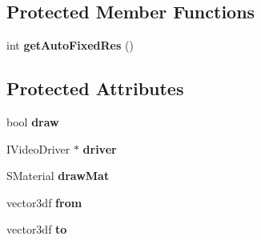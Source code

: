 \subsection*{Protected Member Functions}
\begin{DoxyCompactItemize}
\item 
\hypertarget{class_c_irr_b_p_rope_soft_body_ad88fd0d67c87ac43937430d8ba0e976a}{
int {\bfseries getAutoFixedRes} ()}
\label{class_c_irr_b_p_rope_soft_body_ad88fd0d67c87ac43937430d8ba0e976a}

\end{DoxyCompactItemize}
\subsection*{Protected Attributes}
\begin{DoxyCompactItemize}
\item 
\hypertarget{class_c_irr_b_p_rope_soft_body_a5685e0a77f938a07748baddb27eb479e}{
bool {\bfseries draw}}
\label{class_c_irr_b_p_rope_soft_body_a5685e0a77f938a07748baddb27eb479e}

\item 
\hypertarget{class_c_irr_b_p_rope_soft_body_a46cfee9ae47a25aa372da32b61f47069}{
IVideoDriver $\ast$ {\bfseries driver}}
\label{class_c_irr_b_p_rope_soft_body_a46cfee9ae47a25aa372da32b61f47069}

\item 
\hypertarget{class_c_irr_b_p_rope_soft_body_ae9557fa43fc0676e6ec4a1f6cfc08027}{
SMaterial {\bfseries drawMat}}
\label{class_c_irr_b_p_rope_soft_body_ae9557fa43fc0676e6ec4a1f6cfc08027}

\item 
\hypertarget{class_c_irr_b_p_rope_soft_body_af5d862af6f6be9139bea7f71692959a0}{
vector3df {\bfseries from}}
\label{class_c_irr_b_p_rope_soft_body_af5d862af6f6be9139bea7f71692959a0}

\item 
\hypertarget{class_c_irr_b_p_rope_soft_body_a0a01a184bc05dd412dcb5808fd54fc6b}{
vector3df {\bfseries to}}
\label{class_c_irr_b_p_rope_soft_body_a0a01a184bc05dd412dcb5808fd54fc6b}

\end{DoxyCompactItemize}


